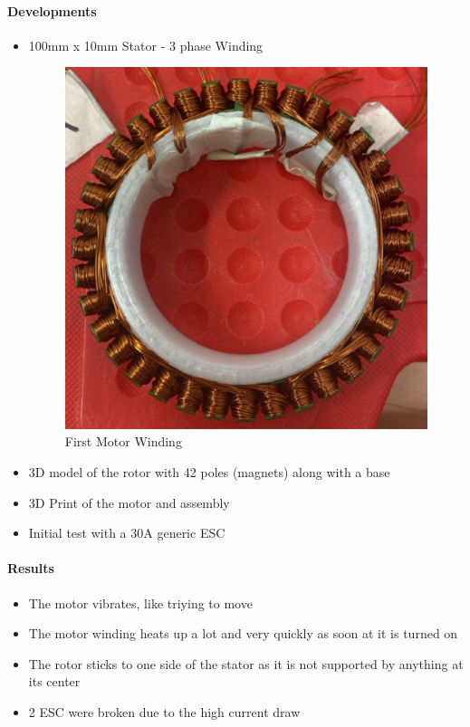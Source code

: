 \documentclass{article}
\begin{document}
\paragraph{Developments}
 \begin{itemize}
    \item 100mm x 10mm Stator - 3 phase Winding
    \begin{figure}[H]
        \centering
        \includegraphics[scale=1.5]{Images/Estator10010PrimerEmbobinado.png}
        \caption{First Motor Winding}
    \end{figure}
    \item 3D model of the rotor with 42 poles (magnets) along with a base
    \item 3D Print of the motor and assembly
    \item Initial test with a 30A generic ESC
 \end{itemize}
\paragraph{Results}
\begin{itemize}
    \item The motor vibrates, like triying to move
    \item The motor winding heats up a lot and very quickly as soon at it is turned on
    \item The rotor sticks to one side of the stator as it is not supported by anything at its center
    \item 2 ESC were broken due to the high current draw
\end{itemize}
\end{document}
